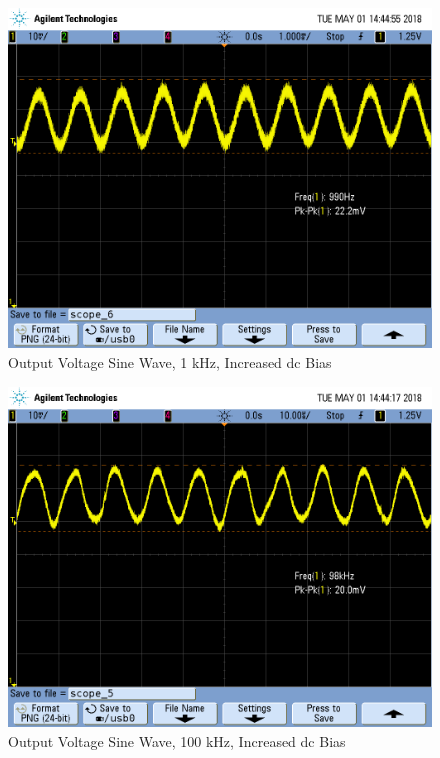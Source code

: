 \begin{figure}[h!]
	\centering
	\includegraphics[scale=0.3]{../images/SCOPE_6.PNG}
	\caption{Output Voltage Sine Wave, 1 \si{\kilo\hertz}, Increased dc Bias}
	\label{fig:1khz_original}
\end{figure}

\FloatBarrier

\begin{figure}[h!]
	\centering
	\includegraphics[scale=0.3]{../images/SCOPE_5.PNG}
	\caption{Output Voltage Sine Wave, 100 \si{\kilo\hertz}, Increased dc Bias}
	\label{fig:100khz_original}
\end{figure}

